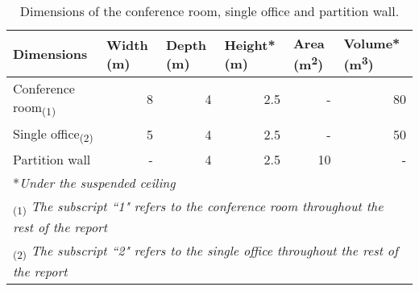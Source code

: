 \begin{table}[htbp]
	\caption{Dimensions of the conference room, single office and partition wall.}
	\label{tbl:room_dims}
	\centering
	\begin{tabular}{@{}lrrrrr@{}}
		\toprule
		Dimensions & \multicolumn{1}{l}{Width (m)} & \multicolumn{1}{l}{Depth (m)} & \multicolumn{1}{l}{Height* (m)} & \multicolumn{1}{l}{Area (m\textsuperscript{2})} & \multicolumn{1}{l}{Volume* (m\textsuperscript{3})} \\ \midrule
		Conference room\textsubscript{(1)} & 8 & 4 & 2.5 & - & 80 \\
		Single office\textsubscript{(2)} & 5 & 4 & 2.5 & - & 50 \\
		Partition wall & - & 4 & 2.5 & 10 & - \\ \bottomrule
		\multicolumn{6}{l}{*\textit{Under the suspended ceiling}} \\
		\multicolumn{6}{l}{\textsubscript{(1)} \textit{The subscript ``1" refers to the conference room throughout the rest of the report}} \\
		\multicolumn{6}{l}{\textsubscript{(2)} \textit{The subscript ``2" refers to the single office throughout the rest of the report}}
	\end{tabular}
\end{table}